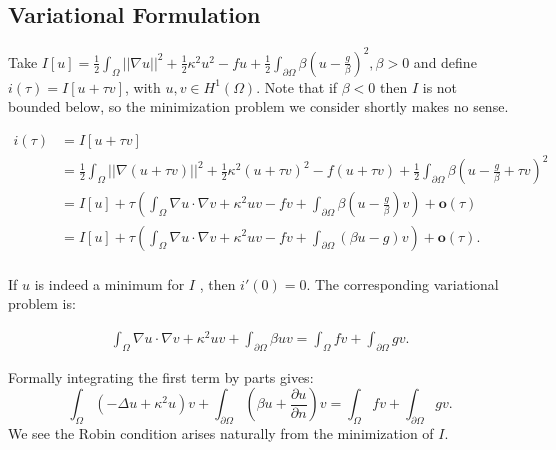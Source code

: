 \documentclass[paper=a4, fontsize=11pt]{scrartcl} %
\numberwithin{equation}{section} %
\numberwithin{figure}{section} %
\numberwithin{table}{section} %
\begin{document}
\subsection{Variational Formulation}
Take $I[u] = \frac{1}{2}\int_{\Omega} ||\nabla u||^{2} + \frac{1}{2}\kappa^{2}u^2 - fu + \frac{1}{2}\int_{\partial \Omega} \beta( u-\frac{g}{\beta})^2, \beta > 0$ and define
$i(\tau) = I[u + \tau v]$, with $u,v \in H^{1}(\Omega)$. Note that if $\beta < 0$ then $I$ is not bounded below, so the minimization
problem we consider shortly makes no sense.

\begin{align*}
  i(\tau) &= I[u + \tau v ] \\
  &= \frac{1}{2}\int_{\Omega} ||\nabla (u+ \tau v)||^{2} + \frac{1}{2}\kappa^{2}(u+ \tau v)^2 - f(u + \tau v) + \frac{1}{2}\int_{\partial \Omega} \beta(u- \frac{g}{\beta}+ \tau v)^2 \\
  &= I[u] + \tau ( \int_{\Omega} \nabla u \cdot \nabla v + \kappa^{2}uv - fv + \int_{\partial \Omega} \beta( u - \frac{g}{\beta}) v ) +\mathbf{o} (\tau)\\
  &= I[u] + \tau ( \int_{\Omega} \nabla u \cdot \nabla v + \kappa^{2}uv - fv + \int_{\partial \Omega} (\beta u - g) v ) +\mathbf{o} (\tau).\\ 
\end{align*}

If $u$ is indeed a minimum for $I$ , then $i'(0) = 0$. The corresponding variational problem is:

\begin{align*}
\int_{\Omega} \nabla u \cdot \nabla v + \kappa^{2}uv + \int_{\partial \Omega} \beta u v  =\int_{\Omega} fv +\int_{\partial \Omega} gv. 
\end{align*}

Formally integrating the first term by parts gives:
$$
\int_{\Omega}  (-\Delta u + \kappa^{2} u) v + \int_{\partial \Omega} ( \beta u + \frac{ \partial u }{\partial n } )v = \int_{\Omega} fv + \int_{\partial \Omega} gv.
$$
We see the Robin condition arises naturally from the minimization of $I$. 


\end{document}
